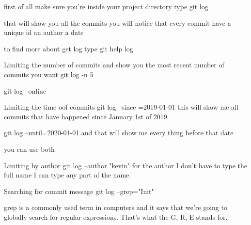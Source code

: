 first of all make sure you're inside your project directory 
type   
  git log 

that will show you all the commits 
you will notice that every commit have 
a unique id 
an author 
a date 

to find more about get log type
  git help log

Limiting the number of commits and show you the most recent number of commits you want 
  git log -n 5 

  git log --online 

Limiting the time oof commits 
  git log --since =2019-01-01
  this will show me all commits that have happened since January 1st of 2019.

  git log --until=2020-01-01 
  and that will show me every thing before that date 

  you can use both 

Limiting by author 
  git log --author "kevin"
   for the author I don't have to type the full name I can type any part of the name.

Searching for commit message 
  git log --grep="Init"

  grep is a commonly used term in computers and it says that 
  we're going to globally search for regular expressions. 
  That's what the G, R, E stands for.  